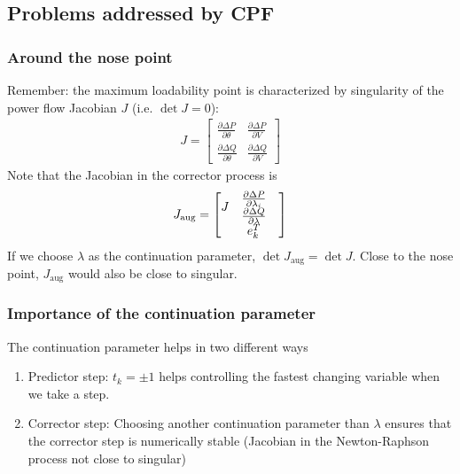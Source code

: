 \documentclass{beamer}
\begin{document}
\subsection{Problems addressed by CPF}

\begin{frame}
  \frametitle{Around the nose point}
Remember: the maximum loadability point is characterized by singularity of the power flow Jacobian $J$ (i.e. $\det J = 0$):
\begin{align}
  \label{eq:9}
  J = \begin{bmatrix}
  \frac{\partial \Delta P}{\partial \theta} & \frac{\partial \Delta P}{\partial V} \\
  \frac{\partial \Delta Q}{\partial \theta} & \frac{\partial \Delta Q}{\partial V}
  \end{bmatrix}
\end{align}
Note that the Jacobian in the corrector process is
\begin{align}
  \label{eq:9}
  J_\text{aug} = \begin{bmatrix}
  \begin{matrix} \vphantom{\begin{matrix} 0 \\ 0 \end{matrix}} 
  J 
 \end{matrix} & \begin{matrix} \frac{\partial \Delta P}{\partial \lambda_i} \\
  \frac{\partial \Delta Q}{\partial \lambda}
  \end{matrix} \\
   & e_k^T & 
  \end{bmatrix}
\end{align}
If we choose $\lambda$ as the continuation parameter, $\det J_\text{aug} = \det J$.
Close to the nose point, $J_\text{aug}$ would also be close to singular.
\end{frame}

\begin{frame}
  \frametitle{Importance of the continuation parameter}
  The continuation parameter helps in two different ways
  \begin{enumerate}
  \item Predictor step: $t_k = \pm 1$ helps controlling the fastest changing variable when we take a step.
  \item Corrector step: Choosing another continuation parameter than $\lambda$ ensures that the corrector step is numerically stable (Jacobian in the Newton-Raphson process not close to singular)
  \end{enumerate}
\end{frame}
\end{document}
